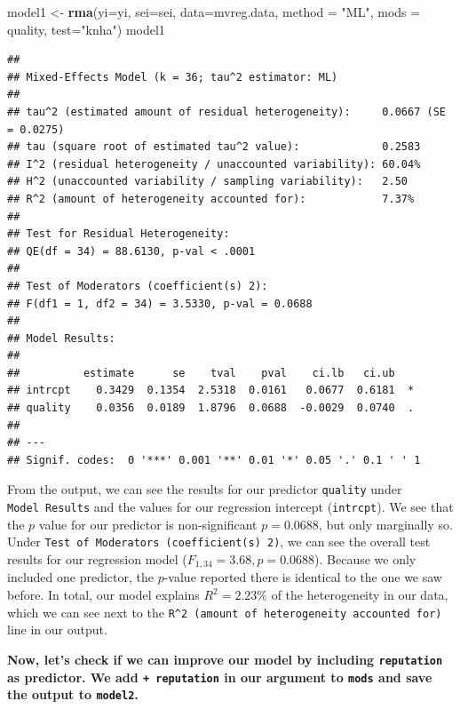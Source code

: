 \documentclass[]{book}
\newenvironment{Shaded}{\begin{snugshade}}{\end{snugshade}}
\newcommand{\DataTypeTok}[1]{\textcolor[rgb]{0.13,0.29,0.53}{#1}}
\newcommand{\KeywordTok}[1]{\textcolor[rgb]{0.13,0.29,0.53}{\textbf{#1}}}
\newcommand{\NormalTok}[1]{#1}
\newcommand{\OperatorTok}[1]{\textcolor[rgb]{0.81,0.36,0.00}{\textbf{#1}}}
\newcommand{\StringTok}[1]{\textcolor[rgb]{0.31,0.60,0.02}{#1}}
\begin{document}
\begin{Shaded}
\begin{Highlighting}[]
\NormalTok{model1 <-}\StringTok{ }\KeywordTok{rma}\NormalTok{(}\DataTypeTok{yi=}\NormalTok{yi, }
              \DataTypeTok{sei=}\NormalTok{sei, }
              \DataTypeTok{data=}\NormalTok{mvreg.data, }
              \DataTypeTok{method =} \StringTok{"ML"}\NormalTok{, }
              \DataTypeTok{mods =} \OperatorTok{~}\StringTok{ }\NormalTok{quality, }
              \DataTypeTok{test=}\StringTok{"knha"}\NormalTok{)}
\NormalTok{model1}
\end{Highlighting}
\end{Shaded}

\begin{verbatim}
## 
## Mixed-Effects Model (k = 36; tau^2 estimator: ML)
## 
## tau^2 (estimated amount of residual heterogeneity):     0.0667 (SE = 0.0275)
## tau (square root of estimated tau^2 value):             0.2583
## I^2 (residual heterogeneity / unaccounted variability): 60.04%
## H^2 (unaccounted variability / sampling variability):   2.50
## R^2 (amount of heterogeneity accounted for):            7.37%
## 
## Test for Residual Heterogeneity: 
## QE(df = 34) = 88.6130, p-val < .0001
## 
## Test of Moderators (coefficient(s) 2): 
## F(df1 = 1, df2 = 34) = 3.5330, p-val = 0.0688
## 
## Model Results:
## 
##          estimate      se    tval    pval    ci.lb   ci.ub   
## intrcpt    0.3429  0.1354  2.5318  0.0161   0.0677  0.6181  *
## quality    0.0356  0.0189  1.8796  0.0688  -0.0029  0.0740  .
## 
## ---
## Signif. codes:  0 '***' 0.001 '**' 0.01 '*' 0.05 '.' 0.1 ' ' 1
\end{verbatim}

From the output, we can see the results for our predictor \texttt{quality} under \texttt{Model\ Results} and the values for our regression intercept (\texttt{intrcpt}). We see that the \(p\) value for our predictor is non-significant \(p=0.0688\), but only marginally so. Under \texttt{Test\ of\ Moderators\ (coefficient(s)\ 2)}, we can see the overall test results for our regression model (\(F_{1,34}=3.68, p=0.0688\)). Because we only included one predictor, the \(p\)-value reported there is identical to the one we saw before. In total, our model explains \(R^2=2.23\%\) of the heterogeneity in our data, which we can see next to the \texttt{R\^{}2\ (amount\ of\ heterogeneity\ accounted\ for)} line in our output.

\textbf{Now, let's check if we can improve our model by including \texttt{reputation} as predictor. We add \texttt{+\ reputation} in our argument to \texttt{mods} and save the output to \texttt{model2}.}
\end{document}

